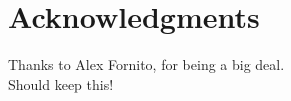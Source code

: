 \documentclass[10pt,letterpaper]{article}
\begin{document}

\section*{Acknowledgments}
Thanks to Alex Fornito, for being a big deal.\\
Should keep this!
\nolinenumbers

%
%
%




%
%

\end{document}
